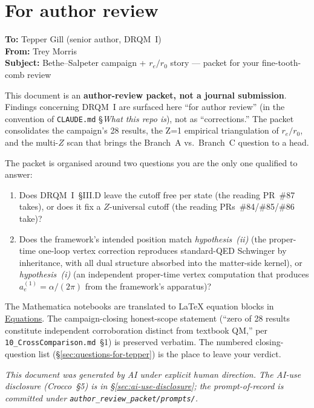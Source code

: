 \section*{For author review}

\noindent\textbf{To:} Tepper Gill (senior author, DRQM~I)\\
\textbf{From:} Trey Morris\\
\textbf{Subject:} Bethe--Salpeter campaign + $r_e/r_0$ story --- packet for your
fine-tooth-comb review

\bigskip

\noindent This document is an \textbf{author-review packet, not a journal
submission}. Findings concerning DRQM~I are surfaced here ``for author review''
(in the convention of \texttt{CLAUDE.md} \S \emph{What this repo is}), not as
``corrections.'' The packet consolidates the campaign's 28 results, the Z=1
empirical triangulation of $r_e/r_0$, and the multi-$Z$ scan that brings the
Branch~A vs.~Branch~C question to a head.

\bigskip

\noindent The packet is organised around two questions you are the only one
qualified to answer:
\begin{enumerate}[leftmargin=*]
  \item Does DRQM~I~\S III.D leave the cutoff free per state (the reading
        PR~\#87 takes), or does it fix a $Z$-universal cutoff (the reading
        PRs~\#84/\#85/\#86 take)?
  \item Does the framework's intended position match \emph{hypothesis~(ii)}
        (the proper-time one-loop vertex correction reproduces standard-QED
        Schwinger by inheritance, with all dual structure absorbed into the
        matter-side kernel), or \emph{hypothesis~(i)} (an independent
        proper-time vertex computation that produces $a_e^{(1)} = \alpha/(2\pi)$
        from the framework's apparatus)?
\end{enumerate}

The Mathematica notebooks are translated to LaTeX equation blocks in
\hyperref[sec:eq-bs-s3]{Equations}. The campaign-closing honest-scope
statement (``zero of 28 results constitute independent corroboration distinct
from textbook QM,'' per \texttt{10\_CrossComparison.md}~\S1) is preserved
verbatim. The numbered closing-question list
(\S\ref{sec:questions-for-tepper}) is the place to leave your verdict.

\bigskip

\noindent\textit{This document was generated by AI under explicit human
direction. The AI-use disclosure (Crocco~\S5) is in
\S\ref{sec:ai-use-disclosure}; the prompt-of-record is committed under
\texttt{author\_review\_packet/prompts/}.}

\clearpage
